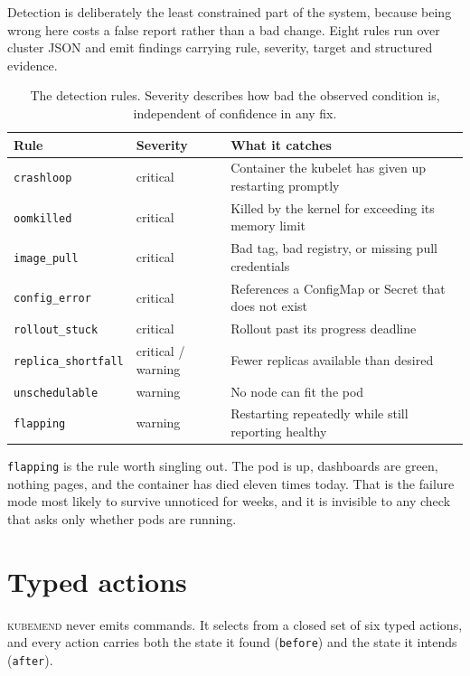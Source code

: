 \documentclass[11pt,a4paper]{article}
\newcommand{\code}[1]{\texttt{\small #1}}
\newcommand{\kubemend}{\textsc{kubemend}}
\begin{document}
Detection is deliberately the least constrained part of the system, because
being wrong here costs a false report rather than a bad change. Eight rules run
over cluster JSON and emit findings carrying rule, severity, target and
structured evidence.

\begin{table}[h]
\centering
\small
\begin{tabularx}{\textwidth}{@{}l l X@{}}
\toprule
\textbf{Rule} & \textbf{Severity} & \textbf{What it catches} \\
\midrule
\code{crashloop}         & critical & Container the kubelet has given up restarting promptly \\
\code{oomkilled}         & critical & Killed by the kernel for exceeding its memory limit \\
\code{image\_pull}       & critical & Bad tag, bad registry, or missing pull credentials \\
\code{config\_error}     & critical & References a ConfigMap or Secret that does not exist \\
\code{rollout\_stuck}    & critical & Rollout past its progress deadline \\
\code{replica\_shortfall}& critical / warning & Fewer replicas available than desired \\
\code{unschedulable}     & warning  & No node can fit the pod \\
\code{flapping}          & warning  & Restarting repeatedly while still reporting healthy \\
\bottomrule
\end{tabularx}
\caption{The detection rules. Severity describes how bad the observed condition
is, independent of confidence in any fix.}
\end{table}

\code{flapping} is the rule worth singling out. The pod is up, dashboards are
green, nothing pages, and the container has died eleven times today. That is the
failure mode most likely to survive unnoticed for weeks, and it is invisible to
any check that asks only whether pods are running.

\section{Typed actions}

\kubemend{} never emits commands. It selects from a closed set of six typed
actions, and every action carries both the state it found (\code{before}) and
the state it intends (\code{after}).
\end{document}
